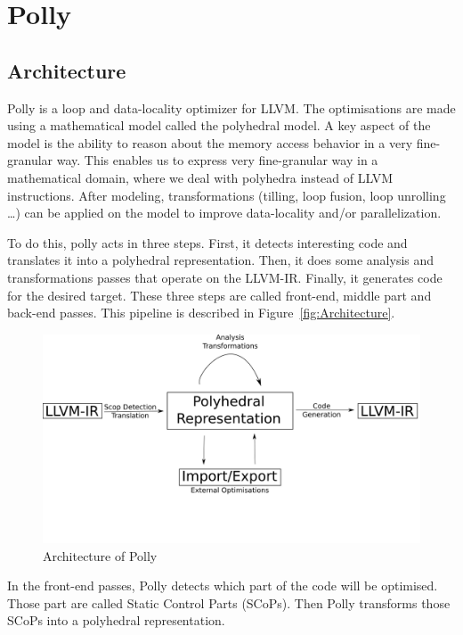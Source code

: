 \chapter{Polly}\label{ch:Polly}

\section{Architecture}
Polly is a loop and data-locality optimizer for LLVM\cite{Polly}. The optimisations are made using a mathematical model called the polyhedral model. A key aspect of the model is the ability to reason about the memory access behavior in a very fine-granular way. This enables us to express very fine-granular way in a mathematical domain, where we deal with polyhedra instead of LLVM instructions. After modeling, transformations (tilling, loop fusion, loop unrolling …) can be applied on the model to improve data-locality and/or parallelization.

To do this, polly acts in three steps. First, it detects interesting code and translates it into a polyhedral representation. Then, it does some analysis and transformations passes that operate on the LLVM-IR. Finally, it generates code for the desired target. These three steps are called front-end, middle part and back-end passes. This pipeline is described in Figure~\ref{fig:Architecture}.

\begin{figure}
\centering
\includegraphics[scale=0.4]{gfx/Polly/Architecture.png}
\caption{Architecture of Polly}
\label{fig:PollyArchitecture}
\end{figure}

In the front-end passes, Polly detects which part of the code will be optimised. Those part are called Static Control Parts (SCoPs). Then Polly transforms those SCoPs into a polyhedral representation. 

